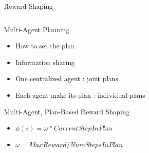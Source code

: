 \documentclass{bredelebeamer}
\begin{document}
\begin{frame}{Reward Shaping}
\begin{columns}
\begin{column}{0.3\linewidth}
\end{column}

\end{columns}

\end{frame}


\begin{frame}

\begin{block}{Multi-Agent Planning}
\begin{itemize}
\item How to set the plan
\item Information sharing
\item One centralized agent : joint plans
\item Each agent make its plan : individual plans
\end{itemize}
\end{block}

\begin{block}{Multi-Agent, Plan-Based Reward Shaping}
\begin{itemize}
\item $\phi (s) = \omega * CurrentStepInPlan$
\item $\omega = MaxReward/NumStepsInPlan$
\end{itemize}
\end{block}

\end{frame}
\end{document}
